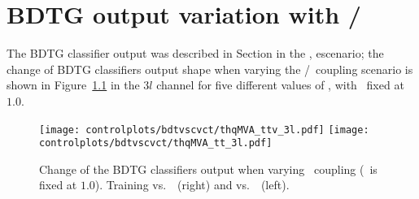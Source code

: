 \chapter{BDTG output variation with \CV/\Ct }\label{sec:bdtvscvct}

The BDTG classifier output was described in Section \label{secc:signal_disc} in the , escenario; the change of BDTG classifiers output shape when varying the \CV/\Ct\ coupling scenario is shown in Figure~\ref{fig:bdtvscvct} in the $3l$ channel for five different values of \Ct, with \CV\ fixed at $1.0$.
\begin{figure} [!h]
  \centering
  \texttt{[image: controlplots/bdtvscvct/thqMVA\_ttv\_3l.pdf]}
  \texttt{[image: controlplots/bdtvscvct/thqMVA\_tt\_3l.pdf]} \\
  \caption[BDTG output variation with \CV/\Ct]{Change of the BDTG classifiers output when varying \Ct\ coupling (\CV\ is fixed at $1.0$). Training vs.\ \ttV\ (right) and vs.\ \ttbar\ (left).}
  \label{fig:bdtvscvct}
\end{figure}

